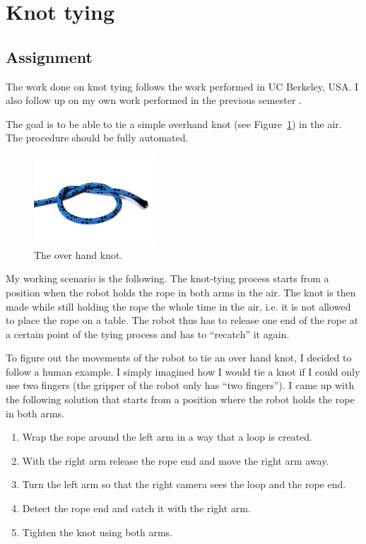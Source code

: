 \graphicspath{{Img/tyer/}}

\section{Knot tying}

    \subsection{Assignment} \label{sec:TheoreticalSolution}
        The work done on knot tying follows the work performed in UC Berkeley, USA. I also follow up on my own work performed in the previous semester \cite{PreDiplomaLejsekHlavac}.

        The goal is to be able to tie a simple overhand knot (see Figure~\ref{fig: over hand knot}) in the air. The procedure should be fully automated.

        \begin{figure}[h]
        \includegraphics[width=0.4\textwidth]{over_hand_knotAdj.png}
        \centering
        \caption{The over hand knot.}
        \label{fig: over hand knot}
        \end{figure}

        My working scenario is the following. The knot-tying process starts from a position when the robot holds the rope in both arms in the air. The knot is then made while still holding the rope the whole time in the air, i.e. it is not allowed to place the rope on a table. The robot thus has to release one end of the rope at a certain point of the tying process and has to ``recatch'' it again.

        To figure out the movements of the robot to tie an over hand knot, I decided to follow a human example. I simply imagined how I would tie a knot if I could only use two fingers (the gripper of the robot only has ``two fingers''). I came up with the following solution that starts from a position where the robot holds the rope in both arms.
%
        \begin{enumerate}\itemsep0pt
        \label{enu:TheoreticalSolution}
            \item Wrap the rope around the left arm in a way that a loop is created.
            \item With the right arm release the rope end and move the right arm away.
            \item Turn the left arm so that the right camera sees the loop and the rope end.
            \item Detect the rope end and catch it with the right arm.
            \item Tighten the knot using both arms.
        \end{enumerate}


